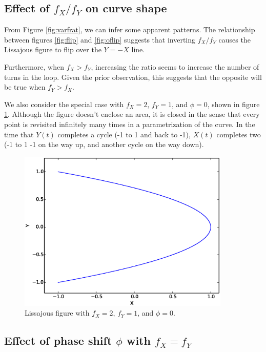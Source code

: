 \documentclass{article}
\theoremstyle{definition}
\renewcommand{\>}{\rangle}
\newcommand{\<}{\langle}
\begin{document}
\subsection{Effect of $f_X/f_Y$ on curve shape}

From Figure \ref{fig:varfrat}, we can infer some apparent patterns. The
relationship between figures \ref{fig:flip} and \ref{fig:oflip} suggests that
inverting $f_X/f_Y$ causes the Lissajous figure to flip over the $Y=-X$ line.

Furthermore, when $f_X > f_Y$, increasing the ratio seems to increase the
number of turns in the loop. Given the prior observation, this suggests
that the opposite will be true when $f_Y > f_X$.

We also consider the special case with $f_X=2$, $f_Y=1$, and $\phi=0$,
shown in figure \ref{fig:special}. Although the figure doesn't enclose an area,
it is closed in the sense that every point is revisited infinitely many times
in a parametrization of the curve. In the time that $Y(t)$ completes a cycle
(-1 to 1 and back to -1), $X(t)$ completes two (-1 to 1 -1 on the way up,
and another cycle on the way down).

\begin{figure}\centering
\includegraphics[width=0.9\textwidth]{special.eps}
\caption{Lissajous figure with $f_X=2$, $f_Y=1$, and $\phi=0$.}\label{fig:special}
\end{figure}

\subsection{Effect of phase shift $\phi$ with $f_X=f_Y$}
\end{document}
